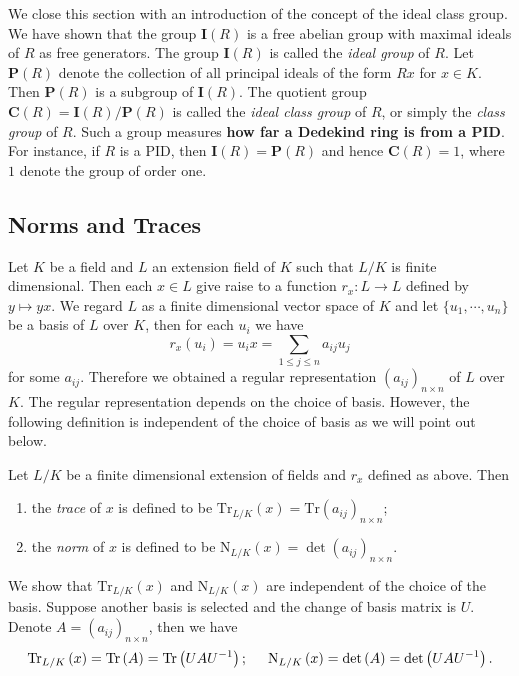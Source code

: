 We close this section with an introduction of the concept of the ideal class group. We have shown that the group $\mathbf{I}(R)$ is a free abelian group with maximal ideals of $R$ as free generators. The group $\mathbf{I}(R)$ is called the \textit{ideal group} of $R$. Let $\mathbf{P}(R)$ denote the collection of all principal ideals of the form $Rx$ for $x\in K$. Then $\mathbf{P}(R)$ is a subgroup of $\mathbf{I}(R)$. The quotient group $\mathbf{C}(R)=\mathbf{I}(R)/\mathbf{P}(R)$ is called the \textit{ideal class group} of $R$, or simply the \textit{class group} of $R$. Such a group measures \textbf{how far a Dedekind ring is from a PID}. For instance, if $R$ is a PID, then $\mathbf{I}(R)=\mathbf{P}(R)$ and hence $\mathbf{C}(R)=1$, where $1$ denote the group of order one.
\subsection{Norms and Traces}
Let $K$ be a field and $L$ an extension field of $K$ such that $L/K$ is finite dimensional. Then each $x\in L$ give raise to a function $r_x:L\to L$ defined by $y\mapsto yx$. We regard $L$ as a finite dimensional vector space of $K$ and let $\{u_1,\cdots,u_n\}$ be a basis of $L$ over $K$, then for each $u_i$ we have 
$$
r_x\left( u_i \right) =u_ix=\sum_{1\le j\le n}{a_{ij}u_j}
$$
for some $a_{ij}$. Therefore we obtained a regular representation $(a_{ij})_{n\times n}$ of $L$ over $K$. The regular representation depends on the choice of basis. However, the following definition is independent of the choice of basis as we will point out below.
\begin{definition}
Let $L/K$ be a finite dimensional extension of fields and $r_x$ defined as above. Then 
\begin{enumerate}
    \item the \textit{trace} of $x$ is defined to be $\mathrm{Tr}_{L/K}(x)=\mathrm{Tr}(a_{ij})_{n\times n}$;
    \item the \textit{norm} of $x$ is defined to be $\mathrm{N}_{L/K}(x)=\det(a_{ij})_{n\times n}$.
\end{enumerate}
\end{definition}
We show that $\mathrm{Tr}_{L/K}(x)$ and $\mathrm{N}_{L/K}(x)$ are independent of the choice of the basis. Suppose another basis is selected and the change of basis matrix is $U$. Denote $A=(a_{ij})_{n\times n}$, then we have 
$$
\mathrm{Tr}_{L/K}\left( x \right) =\mathrm{Tr}\left( A \right) =\mathrm{Tr}\left( UAU^{-1} \right) ;\hspace{0.5cm}\mathrm{N}_{L/K}\left( x \right) =\det \left( A \right) =\det \left( UAU^{-1} \right) .
$$
